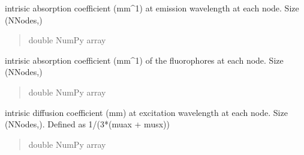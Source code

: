 \documentclass[letterpaper,10pt,english]{sphinxmanual}
\begin{document}
\begin{fulllineitems}
\begin{fulllineitems}
\begin{quote}
\begin{description}
\end{description}\end{quote}

\end{fulllineitems}


\begin{fulllineitems}
\label{\detokenize{_autosummary/nirfasterff.base.fluor_mesh.fluormesh:nirfasterff.base.fluor_mesh.fluormesh.muam}}
\pysigstartsignatures
\pysigline
{}
\pysigstopsignatures
\sphinxAtStartPar
intrisic absorption coefficient (mm\textasciicircum{}\sphinxhyphen{}1) at emission wavelength at each node. Size (NNodes,)
\begin{quote}\begin{description}
\sphinxAtStartPar
double NumPy array

\end{description}\end{quote}

\end{fulllineitems}


\begin{fulllineitems}
\label{\detokenize{_autosummary/nirfasterff.base.fluor_mesh.fluormesh:nirfasterff.base.fluor_mesh.fluormesh.muaf}}
\pysigstartsignatures
\pysigline
{}
\pysigstopsignatures
\sphinxAtStartPar
intrisic absorption coefficient (mm\textasciicircum{}\sphinxhyphen{}1) of the fluorophores at each node. Size (NNodes,)
\begin{quote}\begin{description}
\sphinxAtStartPar
double NumPy array

\end{description}\end{quote}

\end{fulllineitems}


\begin{fulllineitems}
\label{\detokenize{_autosummary/nirfasterff.base.fluor_mesh.fluormesh:nirfasterff.base.fluor_mesh.fluormesh.kappax}}
\pysigstartsignatures
\pysigline
{}
\pysigstopsignatures
\sphinxAtStartPar
intrisic diffusion coefficient (mm) at excitation wavelength at each node. Size (NNodes,). Defined as 1/(3*(muax + musx))
\begin{quote}\begin{description}
\sphinxAtStartPar
double NumPy array


\end{description}
\end{quote}
\end{fulllineitems}
\end{fulllineitems}
\end{document}
